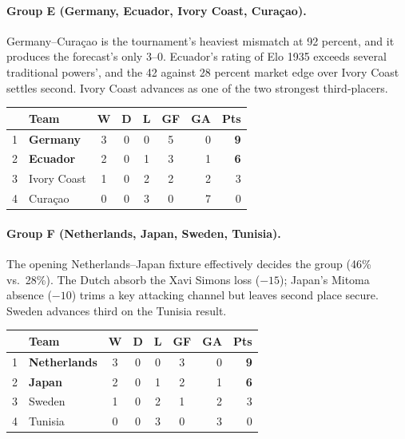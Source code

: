 \documentclass[11pt,letterpaper]{article}
\begin{document}
\paragraph{Group E (Germany, Ecuador, Ivory Coast, Curaçao).} Germany--Curaçao is the tournament's heaviest mismatch at 92 percent, and it produces the forecast's only 3--0. Ecuador's rating of Elo 1935 exceeds several traditional powers', and the 42 against 28 percent market edge over Ivory Coast settles second. Ivory Coast advances as one of the two strongest third-placers.
\smallskip{}\\[1pt]
{\footnotesize
\begin{tabular}{@{}clccccrr@{}}
\toprule
 & Team & W & D & L & GF & GA & Pts \\
\midrule
1 & \textbf{Germany} & 3 & 0 & 0 & 5 & 0 & \textbf{9} \\
2 & \textbf{Ecuador} & 2 & 0 & 1 & 3 & 1 & \textbf{6} \\
3 & Ivory Coast & 1 & 0 & 2 & 2 & 2 & 3 \\
4 & Curaçao & 0 & 0 & 3 & 0 & 7 & 0 \\
\bottomrule
\end{tabular}}\smallskip

\paragraph{Group F (Netherlands, Japan, Sweden, Tunisia).} The opening Netherlands--Japan fixture effectively decides the group (46\% vs.\ 28\%). The Dutch absorb the Xavi Simons loss ($-15$); Japan's Mitoma absence ($-10$) trims a key attacking channel but leaves second place secure. Sweden advances third on the Tunisia result.
\smallskip{}\\[1pt]
{\footnotesize
\begin{tabular}{@{}clccccrr@{}}
\toprule
 & Team & W & D & L & GF & GA & Pts \\
\midrule
1 & \textbf{Netherlands} & 3 & 0 & 0 & 3 & 0 & \textbf{9} \\
2 & \textbf{Japan} & 2 & 0 & 1 & 2 & 1 & \textbf{6} \\
3 & Sweden & 1 & 0 & 2 & 1 & 2 & 3 \\
4 & Tunisia & 0 & 0 & 3 & 0 & 3 & 0 \\
\bottomrule
\end{tabular}}\smallskip
\end{document}

